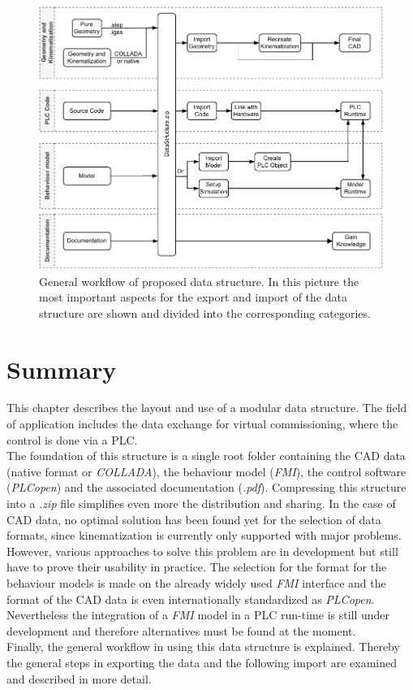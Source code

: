 	\begin{figure}[ht]
		\centering
		\includegraphics{figures/GeneralWorkflow.pdf}
		\caption[General workflow of proposed data structure.]{General workflow of proposed data structure. In this picture the most important aspects for the export and import of the data structure are shown and divided into the corresponding categories. }
		\label{fig:GeneralWorkflow}
	\end{figure}

	
    
    
\section{Summary}
    This chapter describes the layout and use of a modular data structure. The field of application includes the data exchange for virtual commissioning, where the control is done via a PLC. \\
    The foundation of this structure is a single root folder containing the CAD data (native format or \textit{COLLADA}), the behaviour model (\textit{FMI}), the control software (\textit{PLCopen}) and the associated documentation (\textit{.pdf}). Compressing this structure into a \textit{.zip} file simplifies even more the distribution and sharing.
    In the case of CAD data, no optimal solution has been found yet for the selection of data formats, since kinematization is currently only supported with major problems. However, various approaches to solve this problem are in development but still have to prove their usability in practice. The selection for the format for the behaviour models is made on the already widely used \textit{FMI} interface and the format of the CAD data is even internationally standardized as \textit{PLCopen}. Nevertheless the integration of a \textit{FMI} model in a PLC run-time is still under development and therefore alternatives must be found at the moment. \\
    Finally, the general workflow in using this data structure is explained. Thereby the general steps in exporting the data and the following import are examined and described in more detail. 